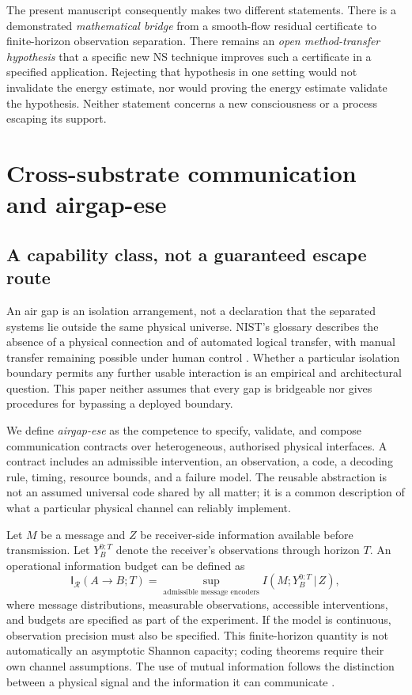 \documentclass[11pt,a4paper]{article}
\theoremstyle{definition}
\theoremstyle{remark}
\newcommand{\calR}{\mathcal{R}}
\newcommand{\given}{\,\vert\,}
\begin{document}
The present manuscript consequently makes two different statements. There is a demonstrated \emph{mathematical bridge} from a smooth-flow residual certificate to finite-horizon observation separation. There remains an \emph{open method-transfer hypothesis} that a specific new NS technique improves such a certificate in a specified application. Rejecting that hypothesis in one setting would not invalidate the energy estimate, nor would proving the energy estimate validate the hypothesis. Neither statement concerns a new consciousness or a process escaping its support.


\section{Cross-substrate communication and airgap-ese}\label{sec:channels}
\subsection{A capability class, not a guaranteed escape route}
An air gap is an isolation arrangement, not a declaration that the separated systems lie outside the same physical universe. NIST's glossary describes the absence of a physical connection and of automated logical transfer, with manual transfer remaining possible under human control \citep{nist}. Whether a particular isolation boundary permits any further usable interaction is an empirical and architectural question. This paper neither assumes that every gap is bridgeable nor gives procedures for bypassing a deployed boundary.

We define \emph{airgap-ese} as the competence to specify, validate, and compose communication contracts over heterogeneous, authorised physical interfaces. A contract includes an admissible intervention, an observation, a code, a decoding rule, timing, resource bounds, and a failure model. The reusable abstraction is not an assumed universal code shared by all matter; it is a common description of what a particular physical channel can reliably implement.

Let $M$ be a message and $Z$ be receiver-side information available before transmission. Let $Y_B^{0:T}$ denote the receiver's observations through horizon $T$. An operational information budget can be defined as
\begin{equation}\label{eq:infobudget}
 \mathsf I_{\calR}(A\!\to\!B;T)
 =\sup_{\text{admissible message encoders}}
 I(M;Y_B^{0:T}\given Z),
\end{equation}
where message distributions, measurable observations, accessible interventions, and budgets are specified as part of the experiment. If the model is continuous, observation precision must also be specified. This finite-horizon quantity is not automatically an asymptotic Shannon capacity; coding theorems require their own channel assumptions. The use of mutual information follows the distinction between a physical signal and the information it can communicate \citep{shannon}.
\end{document}
